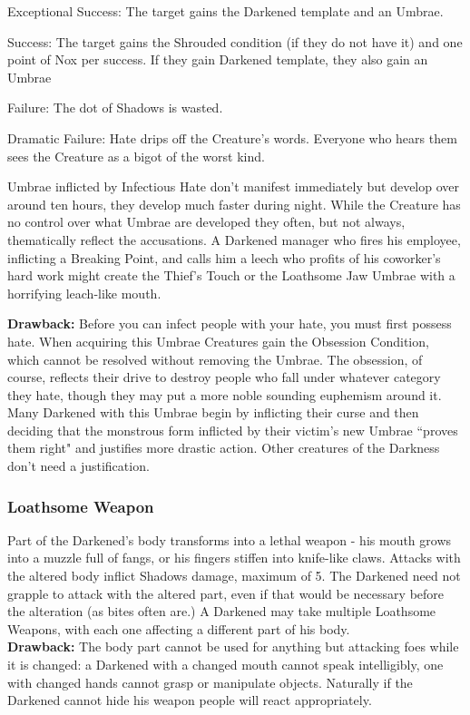 Exceptional Success: The target gains the Darkened template and an Umbrae.

Success: The target gains the Shrouded condition (if they do not have it) and one point of Nox per success. If they gain Darkened template, they also gain an Umbrae

Failure: The dot of Shadows is wasted.

Dramatic Failure: Hate drips off the Creature's words. Everyone who hears them sees the Creature as a bigot of the worst kind.

Umbrae inflicted by Infectious Hate don't manifest immediately but develop over around ten hours, they develop much faster during night. While the Creature has no control over what Umbrae are developed they often, but not always, thematically reflect the accusations. A Darkened manager who fires his employee, inflicting a Breaking Point, and calls him a leech who profits of his coworker's hard work might create the Thief's Touch or the Loathsome Jaw Umbrae with a horrifying leach-like mouth.


\noindent  \textbf{Drawback:} Before you can infect people with your hate, you must first possess hate. When acquiring this Umbrae Creatures gain the Obsession Condition, which cannot be resolved without removing the Umbrae. The obsession, of course, reflects their drive to destroy people who fall under whatever category they hate, though they may put a more noble sounding euphemism around it. Many Darkened with this Umbrae begin by inflicting their curse and then deciding that the monstrous form inflicted by their victim's new Umbrae \textquotedblleft proves them right" and justifies more drastic action. Other creatures of the Darkness don't need a justification.
\subsubsection*{Loathsome Weapon}

Part of the Darkened's body transforms into a lethal weapon - his mouth grows into a muzzle full of fangs, or his fingers stiffen into knife-like claws. Attacks with the altered body inflict Shadows damage, maximum of 5. The Darkened need not grapple to attack with the altered part, even if that would be necessary before the alteration (as bites often are.) A Darkened may take multiple Loathsome Weapons, with each one affecting a different part of his body. \\

\noindent \textbf{Drawback:} The body part cannot be used for anything but attacking foes while it is changed: a Darkened with a changed mouth cannot speak intelligibly, one with changed hands cannot grasp or manipulate objects. Naturally if the Darkened cannot hide his weapon people will react appropriately. 

